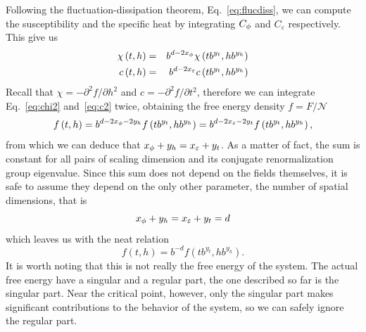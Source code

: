 Following the fluctuation-dissipation theorem, Eq.~\ref{eq:flucdiss}, we can
compute the susceptibility and the specific heat by integrating $C_\phi$ and
$C_\varepsilon$ respectively. This give us
\begin{eqnarray}
    \label{eq:chi2}
    \chi\left(t,h\right) & = & b^{d-2x_{\phi}}\chi\left(tb^{y_{t}},hb^{y_{h}}\right)\\
    \label{eq:c2}
    c\left(t,h\right) & = & b^{d-2x_{\varepsilon}}c\left(tb^{y_{t}},hb^{y_{h}}\right)
\end{eqnarray}
Recall that $\chi=-\partial^2 f/\partial h^2$ and $c=-\partial^2 f/\partial
t^2$, therefore we can integrate Eq.~\ref{eq:chi2} and~\ref{eq:c2} twice,
obtaining the free energy density $f=F/\mathcal{N}$
\begin{equation}
    f\left(t,h\right)=
    b^{d-2x_{\phi}-2y_{h}}f\left(tb^{y_{t}},hb^{y_{h}}\right)=
    b^{d-2x_{\varepsilon}-2y_{t}}f\left(tb^{y_{t}},hb^{y_{h}}\right),
\end{equation}
from which we can deduce that $x_\phi+y_h = x_\varepsilon+y_t$. As a matter of
fact, the sum is constant for all pairs of scaling dimension and its conjugate
renormalization group eigenvalue. Since this sum does not depend on the fields
themselves, it is safe to assume they depend on the only other parameter, the
number of spatial dimensions, that is
\begin{equation}
    \label{eq:scald}
    x_\phi+y_h = x_\varepsilon+y_t = d
\end{equation}
which leaves us with the neat relation
\begin{equation}
    f\left(t,h\right)=b^{-d}f\left(tb^{y_{t}},hb^{y_{h}}\right).
\end{equation}
It is worth noting that this is not really the free energy of the system. The
actual free energy have a singular and a regular part, the one described so
far is the singular part. Near the critical point, however, only the singular
part makes significant contributions to the behavior of the system, so we can
safely ignore the regular part.

